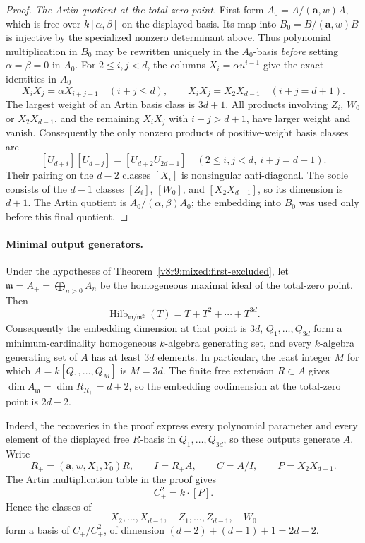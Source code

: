 \documentclass[10pt,fleqn]{article}
\numberwithin{equation}{section}
\newcommand{\Hilb}{\operatorname{Hilb}}
\begin{document}
\begin{proof}
\textit{The Artin quotient at the total-zero point.}
First form $A_0=A/(\mathbf a,w)A$, which is free over
$k[\alpha,\beta]$ on the displayed basis.  Its map into
$B_0=B/(\mathbf a,w)B$ is injective by the specialized nonzero
determinant above.  Thus polynomial multiplication in $B_0$ may be
rewritten uniquely in the $A_0$-basis \emph{before} setting
$\alpha=\beta=0$ in $A_0$.
For $2\le i,j<d$, the columns $X_i=\alpha u^{i-1}$ give the exact
identities in $A_0$
\[
 X_iX_j=\alpha X_{i+j-1}\quad(i+j\le d),\qquad
 X_iX_j=X_2X_{d-1}\quad(i+j=d+1).
\]
The largest weight of an Artin basis class is $3d+1$.
All products involving $Z_i$, $W_0$ or $X_2X_{d-1}$, and the remaining
$X_iX_j$ with $i+j>d+1$, have larger weight and vanish.
Consequently the only nonzero products of positive-weight basis classes are
\[
 [U_{d+i}][U_{d+j}]=[U_{d+2}U_{2d-1}]
       \quad(2\le i,j<d,\ i+j=d+1).
\]
Their pairing on the $d-2$ classes $[X_i]$ is nonsingular anti-diagonal.
The socle consists of the $d-1$ classes $[Z_i]$, $[W_0]$, and
$[X_2X_{d-1}]$, so its dimension is $d+1$.
The Artin quotient is $A_0/(\alpha,\beta)A_0$; the embedding into $B_0$
was used only before this final quotient.
\end{proof}

\paragraph{Minimal output generators.}
Under the hypotheses of Theorem~\ref{v8r9:mixed:first-excluded}, let
\(\mathfrak m=A_+=\bigoplus_{n>0}A_n\) be the homogeneous maximal ideal of
the total-zero point.  Then
\[
 \Hilb_{\mathfrak m/\mathfrak m^2}(T)=T+T^2+\cdots+T^{3d}.
\]
Consequently the embedding dimension at that point is $3d$,
$Q_1,\ldots,Q_{3d}$ form a minimum-cardinality homogeneous $k$-algebra
generating set, and every $k$-algebra generating set of $A$ has at least
$3d$ elements.  In particular, the least integer $M$ for which
$A=k[Q_1,\ldots,Q_M]$ is $M=3d$.  The finite free extension $R\subset A$ gives
$\dim A_{\mathfrak m}=\dim R_{R_+}=d+2$, so the embedding codimension at
the total-zero point is $2d-2$.

Indeed, the recoveries in the proof express every polynomial parameter and
every element of the displayed free $R$-basis in
$Q_1,\ldots,Q_{3d}$, so these outputs generate $A$.  Write
\[
 R_+=(\mathbf a,w,X_1,Y_0)R,\qquad I=R_+A,\qquad C=A/I,
 \qquad P=X_2X_{d-1}.
\]
The Artin multiplication table in the proof gives
\[
 C_+^2=k\cdot[P].
\]
Hence the classes of
\[
 X_2,\ldots,X_{d-1},\quad Z_1,\ldots,Z_{d-1},\quad W_0
\]
form a basis of $C_+/C_+^2$, of dimension
$(d-2)+(d-1)+1=2d-2$.
\end{document}
